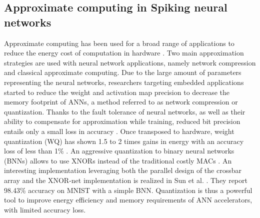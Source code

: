 \subsection{Approximate computing in Spiking neural networks}
Approximate computing has been used for a broad range of applications to reduce the energy cost of computation in hardware \cite{han2013approximate}. Two main approximation strategies are used with neural network applications, namely network compression and classical approximate computing.
Due to the large amount of parameters representing the neural networks, researchers targeting embedded applications started to reduce the weight and activation map precision to decrease the memory footprint of ANNs, a method referred to as network compression or quantization.
Thanks to the fault tolerance of neural networks, as well as their ability to compensate for approximation while training, reduced bit precision entails only a small loss in accuracy \cite{courbariaux2015binaryconnect, han2015deep, hubara2017quantized, rastegari2016xnor}.
Once transposed to hardware, weight quantization (WQ) has shown 1.5 to 2 times gains in energy
with an accuracy loss of less than 1\% \cite{moons20160, whatmough201714}. An aggressive quantization to binary neural networks (BNNs) allows to use XNORs instead of the traditional costly MACs \cite{rastegari2016xnor}. An interesting implementation leveraging both the parallel design of the crossbar array and the XNOR-net implementation is realized in Sun et al. \cite{sun2018xnor}. They report 98.43\% accuracy on MNIST with a simple BNN. Quantization is thus a powerful tool to improve energy efficiency and memory requirements of ANN accelerators, with limited accuracy loss.

